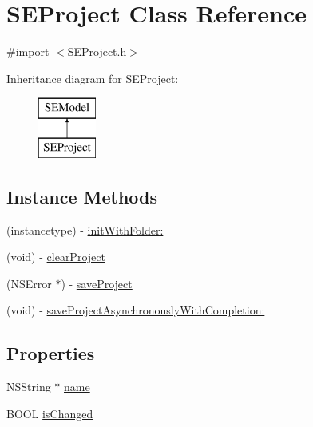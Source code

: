 \hypertarget{interface_s_e_project}{\section{S\-E\-Project Class Reference}
\label{interface_s_e_project}
}


{\ttfamily \#import $<$S\-E\-Project.\-h$>$}

Inheritance diagram for S\-E\-Project\-:\begin{figure}[H]
\begin{center}
\leavevmode
\includegraphics[height=2.000000cm]{interface_s_e_project}
\end{center}
\end{figure}
\subsection*{Instance Methods}
\begin{DoxyCompactItemize}
\item 
(instancetype) -\/ \hyperlink{interface_s_e_project_a321757359b849bd9ec36324d3fe128ab}{init\-With\-Folder\-:}
\item 
(void) -\/ \hyperlink{interface_s_e_project_a191586c8f8464149aa101709b3b712b9}{clear\-Project}
\item 
(N\-S\-Error $\ast$) -\/ \hyperlink{interface_s_e_project_af1ae48fbd2576ff28449dcedf0dc8f29}{save\-Project}
\item 
(void) -\/ \hyperlink{interface_s_e_project_a996a39778f2d176ecf7ffda117703f6c}{save\-Project\-Asynchronously\-With\-Completion\-:}
\end{DoxyCompactItemize}
\subsection*{Properties}
\begin{DoxyCompactItemize}
\item 
N\-S\-String $\ast$ \hyperlink{interface_s_e_project_adf05552fc2cf324eb3511d3bd1b8a996}{name}
\item 
B\-O\-O\-L \hyperlink{interface_s_e_project_a4da84c0c1ef729881956646b15762cc9}{is\-Changed}
\end{DoxyCompactItemize}


